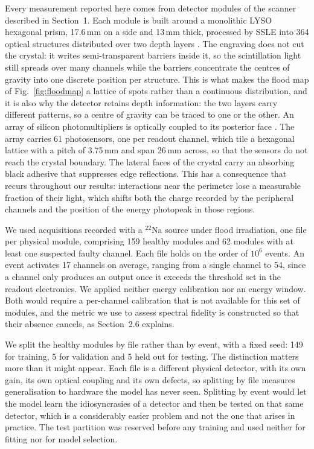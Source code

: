 \documentclass[10pt,conference]{IEEEtran}
\begin{document}
Every measurement reported here comes from detector modules of the scanner
described in Section~1. Each module is built around a monolithic LYSO hexagonal
prism, 17.6\,mm on a side and 13\,mm thick, processed by SSLE into 364 optical
structures distributed over two depth layers
\cite{perez-benito_laser-microstructured_2025}. The engraving does not cut the
crystal: it writes semi-transparent barriers inside it, so the scintillation
light still spreads over many channels while the barriers concentrate the
centres of gravity into one discrete position per structure. This is what makes
the flood map of Fig.~\ref{fig:floodmap} a lattice of spots rather than a
continuous distribution, and it is also why the detector retains depth
information: the two layers carry different patterns, so a centre of gravity can
be traced to one or the other. An array of
silicon photomultipliers is optically coupled to its posterior face
\cite{perez-benito_sipm-based_2019}. The array carries 61 photosensors, one per
readout channel, which tile a hexagonal lattice with a pitch of 3.75\,mm and span
26\,mm across, so that the sensors do not reach the crystal boundary. The lateral faces of the crystal carry an absorbing black adhesive
that suppresses edge reflections. This has a consequence that recurs
throughout our results: interactions near the perimeter lose a measurable
fraction of their light, which shifts both the charge recorded by the peripheral
channels and the position of the energy photopeak in those regions.

We used acquisitions recorded with a $^{22}$Na source under flood irradiation,
one file per physical module, comprising 159 healthy modules and 62 modules
with at least one suspected faulty channel. Each file holds on the order of
$10^6$ events. An event activates 17 channels on average, ranging from a single
channel to 54, since a channel only produces an output once it exceeds the
threshold set in the readout electronics. We applied neither energy calibration
nor an energy window. Both would require a per-channel calibration that is not
available for this set of modules, and the metric we use to assess spectral
fidelity is constructed so that their absence cancels, as
Section~2.6 explains.

We split the healthy modules by file rather than by event, with a fixed seed:
149 for training, 5 for validation and 5 held out for testing. The distinction
matters more than it might appear. Each file is a different physical detector,
with its own gain, its own optical coupling and its own defects, so splitting
by file measures generalisation to hardware the model has never seen. Splitting
by event would let the model learn the idiosyncrasies of a detector and then be
tested on that same detector, which is a considerably easier problem and not
the one that arises in practice. The test partition was reserved before any
training and used neither for fitting nor for model selection.
\end{document}
